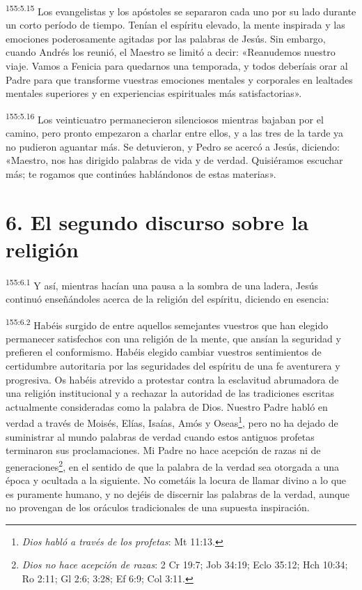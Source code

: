 \par
\textsuperscript{155:5.15} Los evangelistas y los apóstoles se separaron cada uno por su lado durante un corto período de tiempo. Tenían el espíritu elevado, la mente inspirada y las emociones poderosamente agitadas por las palabras de Jesús. Sin embargo, cuando Andrés los reunió, el Maestro se limitó a decir: «Reanudemos nuestro viaje. Vamos a Fenicia para quedarnos una temporada, y todos deberíais orar al Padre para que transforme vuestras emociones mentales y corporales en lealtades mentales superiores y en experiencias espirituales más satisfactorias».

\par
\textsuperscript{155:5.16} Los veinticuatro permanecieron silenciosos mientras bajaban por el camino, pero pronto empezaron a charlar entre ellos, y a las tres de la tarde ya no pudieron aguantar más. Se detuvieron, y Pedro se acercó a Jesús, diciendo: «Maestro, nos has dirigido palabras de vida y de verdad. Quisiéramos escuchar más; te rogamos que continúes hablándonos de estas materias».

\section*{6. El segundo discurso sobre la religión}
\par
\textsuperscript{155:6.1} Y así, mientras hacían una pausa a la sombra de una ladera, Jesús continuó enseñándoles acerca de la religión del espíritu, diciendo en esencia:

\par
\textsuperscript{155:6.2} Habéis surgido de entre aquellos semejantes vuestros que han elegido permanecer satisfechos con una religión de la mente, que ansían la seguridad y prefieren el conformismo. Habéis elegido cambiar vuestros sentimientos de certidumbre autoritaria por las seguridades del espíritu de una fe aventurera y progresiva. Os habéis atrevido a protestar contra la esclavitud abrumadora de una religión institucional y a rechazar la autoridad de las tradiciones escritas actualmente consideradas como la palabra de Dios. Nuestro Padre habló en verdad a través de Moisés, Elías, Isaías, Amós y Oseas\footnote{\textit{Dios habló a través de los profetas}: Mt 11:13.}, pero no ha dejado de suministrar al mundo palabras de verdad cuando estos antiguos profetas terminaron sus proclamaciones. Mi Padre no hace acepción de razas ni de generaciones\footnote{\textit{Dios no hace acepción de razas}: 2 Cr 19:7; Job 34:19; Eclo 35:12; Hch 10:34; Ro 2:11; Gl 2:6; 3:28; Ef 6:9; Col 3:11.}, en el sentido de que la palabra de la verdad sea otorgada a una época y ocultada a la siguiente. No cometáis la locura de llamar divino a lo que es puramente humano, y no dejéis de discernir las palabras de la verdad, aunque no provengan de los oráculos tradicionales de una supuesta inspiración.

